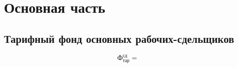 \chapter{Основная часть}


\section{Тарифный фонд основных рабочих-сдельщиков}

\[
\text{Ф}_\text{тар}^\text{сд}=
\]